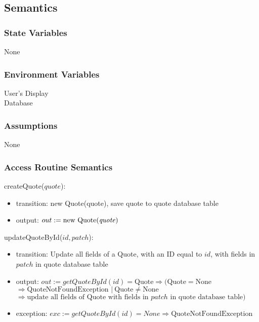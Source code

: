 \documentclass[12pt, titlepage]{article}
\begin{document}
\subsection{Semantics}

\subsubsection{State Variables}

None

\subsubsection{Environment Variables}

User's Display \\ Database

\subsubsection{Assumptions}

None

\subsubsection{Access Routine Semantics}

\noindent createQuote($quote$):
\begin{itemize}
	\item transition: new Quote(quote), save quote to quote database table
	\item output: $out := \text{new Quote(\emph{quote})}$
\end{itemize}

\noindent updateQuoteById($id, patch$):
\begin{itemize}
	\item transition: Update all fields of a Quote, with an ID equal to $id$, with fields in $patch$ in quote
	      database table
	\item output: $out := getQuoteById(id) = \text{Quote} \Rightarrow (\text{Quote} = \text{None} $ \\
		      $\Rightarrow \text{QuoteNotFoundException } |\ \text{Quote} \neq \text{None}$ \\ $\Rightarrow
		      \text{update all fields of Quote with fields in } patch \text{ in quote database table})$
	\item exception: $exc := getQuoteById(id) = None \Rightarrow \text{QuoteNotFoundException}$
\end{itemize}
\end{document}
